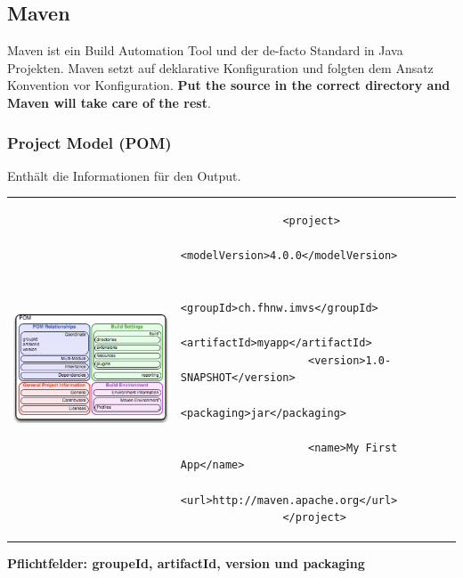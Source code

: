 \documentclass[10pt]{article}
\begin{document}
\subsection{Maven}
Maven ist ein Build Automation Tool und der de-facto Standard in Java Projekten. Maven setzt auf deklarative Konfiguration und folgten dem Ansatz Konvention vor Konfiguration. \textbf{Put the source in the correct directory and Maven will take care of the rest}.

\subsubsection{Project Model (POM)}
Enthält die Informationen für den Output.


\begin{center}
	\begin{tabular}{|ll|c} 
		\includegraphics[scale=0.5\textwidth]{assets/pom.png} 
		& 
		\lstset{language=XML}
			\begin{lstlisting}
				<project>
					<modelVersion>4.0.0</modelVersion> 
					
					<groupId>ch.fhnw.imvs</groupId>
					<artifactId>myapp</artifactId>
					<version>1.0-SNAPSHOT</version>
					<packaging>jar</packaging>
					
					<name>My First App</name>
					<url>http://maven.apache.org</url>
				</project>
			\end{lstlisting}
		\\
	\end{tabular}
\textbf{Pflichtfelder: groupeId, artifactId, version und packaging}
\end{center}
\end{document}
